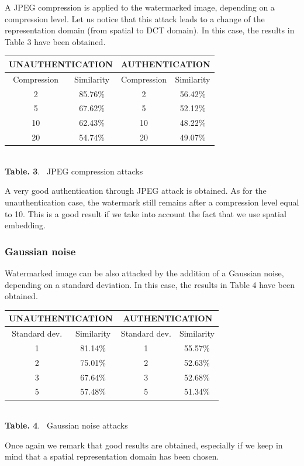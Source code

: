 A JPEG compression is applied to the watermarked image, depending on a
compression level. Let us notice that this attack leads to a change of
the representation domain (from spatial to DCT domain). In this case, the results in Table 3 have been obtained.

\begin{center}
\begin{footnotesize}
\begin{tabular}{|c|c||c|c|}
\hline
\multicolumn{2}{|c||}{UNAUTHENTICATION}  & \multicolumn{2}{c|}{AUTHENTICATION}\\ 
\hline
Compression & Similarity & Compression & Similarity \\
 \hline
2 & 85.76\% & 2 & 56.42\% \\
5 & 67.62\% & 5 & 52.12\% \\
10 & 62.43\% & 10 & 48.22\% \\
20 & 54.74\% & 20 & 49.07\% \\
\hline
\end{tabular}
\end{footnotesize}\\
\vspace{0.5cm}
\textbf{Table. 3}. ~JPEG compression attacks
\end{center}

A very good authentication through JPEG attack is obtained. As for the
unauthentication case, the watermark still remains after a compression level
equal to 10. This is a good result if we take into account the fact that we
use spatial embedding.

\subsubsection{Gaussian noise}

Watermarked image can be also attacked by the addition of a Gaussian noise, depending on a standard deviation. In this case, the results in Table 4 have been obtained.


\begin{center}
\begin{footnotesize}
\begin{tabular}{|c|c||c|c|}
\hline
\multicolumn{2}{|c||}{UNAUTHENTICATION}  & \multicolumn{2}{c|}{AUTHENTICATION}\\ 
\hline
Standard dev. & Similarity & Standard dev. & Similarity \\
 \hline
1 & 81.14\% & 1 & 55.57\% \\
2 & 75.01\% & 2 & 52.63\% \\
3 & 67.64\% & 3 & 52.68\% \\
5 & 57.48\% & 5 & 51.34\% \\
\hline
\end{tabular}
\end{footnotesize}\\
\vspace{0.5cm}
\textbf{Table. 4}. ~Gaussian noise attacks
\end{center}


Once again we remark that good results are obtained, especially if we keep in
mind that a spatial representation domain has been chosen.
